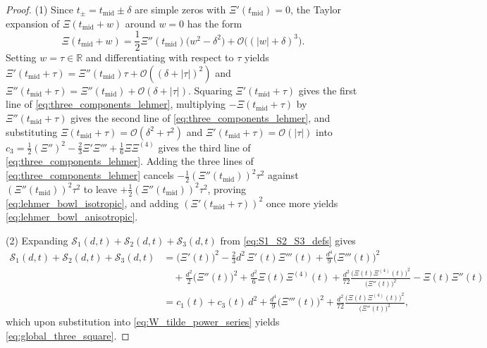 \documentclass[11pt,reqno,a4paper]{amsart}
\theoremstyle{plain}
\theoremstyle{definition}
\theoremstyle{remark}
\numberwithin{equation}{section}
\begin{document}
\begin{proof}
(1) Since $t_\pm = t_{\mathrm{mid}} \pm \delta$ are simple zeros with $\Xi'(t_{\mathrm{mid}}) = 0$, the Taylor expansion of $\Xi(t_{\mathrm{mid}} + w)$ around $w = 0$ has the form
\begin{equation}\label{eq:Xi_lehmer_weierstrass}
  \Xi(t_{\mathrm{mid}} + w) = \frac{1}{2}\Xi''(t_{\mathrm{mid}})\big(w^2 - \delta^2\big) + \mathcal{O}\big((|w|+\delta)^3\big).
\end{equation}
Setting $w = \tau \in \mathbb{R}$ and differentiating with respect to $\tau$ yields $\Xi'(t_{\mathrm{mid}}+\tau) = \Xi''(t_{\mathrm{mid}})\tau + \mathcal{O}((\delta+|\tau|)^2)$ and $\Xi''(t_{\mathrm{mid}}+\tau) = \Xi''(t_{\mathrm{mid}}) + \mathcal{O}(\delta+|\tau|)$. Squaring $\Xi'(t_{\mathrm{mid}}+\tau)$ gives the first line of \eqref{eq:three_components_lehmer}, multiplying $-\Xi(t_{\mathrm{mid}}+\tau)$ by $\Xi''(t_{\mathrm{mid}}+\tau)$ gives the second line of \eqref{eq:three_components_lehmer}, and substituting $\Xi(t_{\mathrm{mid}}+\tau) = \mathcal{O}(\delta^2+\tau^2)$ and $\Xi'(t_{\mathrm{mid}}+\tau) = \mathcal{O}(|\tau|)$ into $c_3 = \frac{1}{2}(\Xi'')^2 - \frac{2}{3}\Xi'\Xi''' + \frac{1}{6}\Xi\Xi^{(4)}$ gives the third line of \eqref{eq:three_components_lehmer}. Adding the three lines of \eqref{eq:three_components_lehmer} cancels $-\frac{1}{2}(\Xi''(t_{\mathrm{mid}}))^2\tau^2$ against $(\Xi''(t_{\mathrm{mid}}))^2\tau^2$ to leave $+\frac{1}{2}(\Xi''(t_{\mathrm{mid}}))^2\tau^2$, proving \eqref{eq:lehmer_bowl_isotropic}, and adding $(\Xi'(t_{\mathrm{mid}}+\tau))^2$ once more yields \eqref{eq:lehmer_bowl_anisotropic}.

(2) Expanding $\mathcal{S}_1(d,t) + \mathcal{S}_2(d,t) + \mathcal{S}_3(d,t)$ from \eqref{eq:S1_S2_S3_defs} gives
\begin{align*}
  \mathcal{S}_1(d,t) + \mathcal{S}_2(d,t) + \mathcal{S}_3(d,t)
  &= \big(\Xi'(t)\big)^2 - \frac{2}{3}d^2\,\Xi'(t)\Xi'''(t) + \frac{d^4}{9}\big(\Xi'''(t)\big)^2 \\
  &\quad + \frac{d^2}{2}\big(\Xi''(t)\big)^2 + \frac{d^2}{6}\Xi(t)\Xi^{(4)}(t) + \frac{d^2}{72}\frac{\big(\Xi(t)\Xi^{(4)}(t)\big)^2}{\big(\Xi''(t)\big)^2} - \Xi(t)\Xi''(t) \\
  &= c_1(t) + c_3(t)\,d^2 + \frac{d^4}{9}\big(\Xi'''(t)\big)^2 + \frac{d^2}{72}\frac{\big(\Xi(t)\Xi^{(4)}(t)\big)^2}{\big(\Xi''(t)\big)^2},
\end{align*}
which upon substitution into \eqref{eq:W_tilde_power_series} yields \eqref{eq:global_three_square}.
\end{proof}
\end{document}
